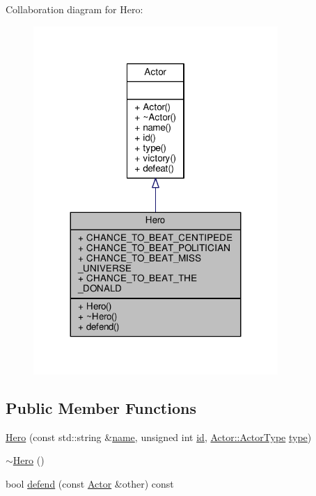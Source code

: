 Collaboration diagram for Hero\+:
\nopagebreak
\begin{figure}[H]
\begin{center}
\leavevmode
\includegraphics[width=263pt]{classHero__coll__graph}
\end{center}
\end{figure}
\subsection*{Public Member Functions}
\begin{DoxyCompactItemize}
\item 
\hyperlink{classHero_a29fa67296e31abaedeaedfdc39a9ed36}{Hero} (const std\+::string \&\hyperlink{classActor_a400c24cfb4609e95e869bfe970f386c5}{name}, unsigned int \hyperlink{classActor_a084438abd4bcb9d5e17b8ad75b0f5984}{id}, \hyperlink{classActor_a398752837eee9970ca00a3565e52c4da}{Actor\+::\+Actor\+Type} \hyperlink{classActor_a2be506fc6785b49d642a1b8f445c5c00}{type})
\item 
\hyperlink{classHero_a5aeef41ede5a80dc29c5acd7b553c4da}{$\sim$\+Hero} ()
\item 
bool \hyperlink{classHero_a7168d1fa26c3346cf0f541f4447bc05d}{defend} (const \hyperlink{classActor}{Actor} \&other) const 
\end{DoxyCompactItemize}
